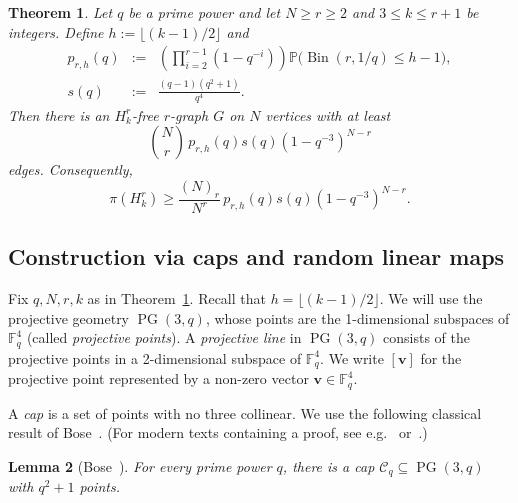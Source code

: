\documentclass[12pt,a4paper]{article}
\numberwithin{equation}{section}
\newtheorem{theorem}{Theorem}[section]
\newtheorem{lemma}[theorem]{Lemma}
\theoremstyle{definition}
\theoremstyle{remark}
\newcommand{\V}[1]{\boldsymbol{#1}}
\begin{document}
\begin{theorem}\label{thm:poisson-finite}
	Let $q$ be a prime power and let $N\ge r\ge2$ and $3\le k\le r+1$ be integers. Define $h:=\lfloor (k-1)/2\rfloor$ and
	\begin{eqnarray*}
	p_{r,h}(q)&:=&\left(\prod_{i=2}^{r-1}(1-q^{-i})\right)
	\mathbb P\bigl(\operatorname{Bin}(r,1/q)\le h-1\bigr),\\
 s(q)&:=&\frac{(q-1)(q^2+1)}{q^4}.\end{eqnarray*} 
  Then there is an $H_k^r$-free $r$-graph $G$ on $N$ vertices with at least
	$$
	\binom Nr\,p_{r,h}(q)s(q)(1-q^{-3})^{N-r}
	$$
	edges. Consequently,
	\begin{equation}\label{eq:poisson-exact}
		\pi(H_k^r)\ge
		\frac{(N)_r}{N^r}\,p_{r,h}(q)s(q)(1-q^{-3})^{N-r}.
	\end{equation}
\end{theorem}

\subsection{Construction via caps and random linear maps}

Fix $q,N,r,k$ as in Theorem~\ref{thm:poisson-finite}. Recall that $h=\lfloor(k-1)/2\rfloor$. We will use the {projective geometry $\operatorname{PG}(3,q)$}, whose points are the 1-dimensional subspaces of $\mathbb F_q^4$ (called \emph{projective points}). A \emph{projective line} in $\operatorname{PG}(3,q)$ consists of the projective points in a 2-dimensional subspace of $\mathbb F_q^4$.
We write $[\V{v}]$ for the projective point represented by a non-zero vector $\V{v}\in\mathbb F_q^4$. 

A \emph{cap} is a set of points with no three collinear. We use the following classical result of Bose~\cite[Eq.~(5.60)]{Bose47}.
(For modern texts containing a proof, see e.g.~\cite[Theorem 4.36]{Ball15fgca} or~\cite[Proposition~2.6.6]{BrouwerVanmaldeghem22srg}.)


\begin{lemma}[Bose~\cite{Bose47}]\label{lem:cap}
    For every prime power $q$, there is a cap $\mathcal C_q\subseteq\operatorname{PG}(3,q)$ with $q^2+1$ points.
\end{lemma}
\end{document}
